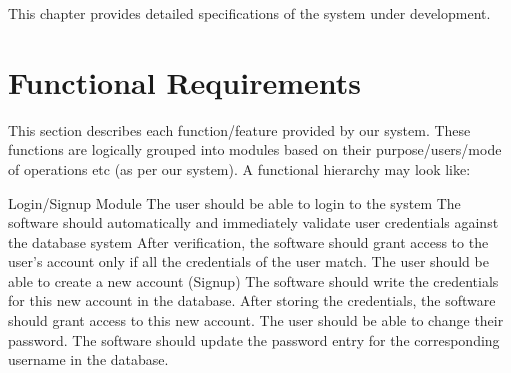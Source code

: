 This chapter provides detailed specifications of the system under development.

\section{Functional Requirements}
This section describes each function/feature provided by our system. These functions are logically grouped into modules based on their purpose/users/mode of operations etc (as per our system). A functional hierarchy may look like:
\begin{outline}
  \1 Login/Signup Module
  \2 The user should be able to login to the system
    \3 The software should automatically and immediately validate user credentials against the database system
    \3 After verification, the software should grant access to the user’s account only if all the credentials of the user match. 
  \2 The user should be able to create a new account (Signup)
    \3 The software should write the credentials for this new account in the database.
    \3 After storing the credentials, the software should grant access to this new account. 
  \2 The user should be able to change their password.
    \3 The software should update the password entry for the corresponding username in the database. 


\end{outline}
